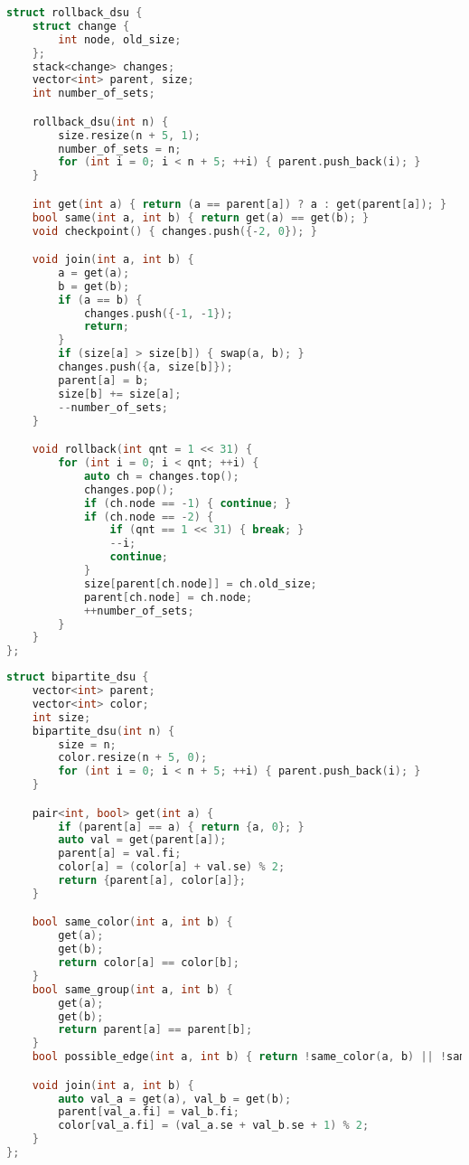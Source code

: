 \documentclass[11pt, a4paper, twoside]{article}
\begin{document}
\begin{lstlisting}[language=C++]
struct rollback_dsu {
    struct change {
        int node, old_size;
    };
    stack<change> changes;
    vector<int> parent, size;
    int number_of_sets;

    rollback_dsu(int n) {
        size.resize(n + 5, 1);
        number_of_sets = n;
        for (int i = 0; i < n + 5; ++i) { parent.push_back(i); }
    }

    int get(int a) { return (a == parent[a]) ? a : get(parent[a]); }
    bool same(int a, int b) { return get(a) == get(b); }
    void checkpoint() { changes.push({-2, 0}); }

    void join(int a, int b) {
        a = get(a);
        b = get(b);
        if (a == b) {
            changes.push({-1, -1});
            return;
        }
        if (size[a] > size[b]) { swap(a, b); }
        changes.push({a, size[b]});
        parent[a] = b;
        size[b] += size[a];
        --number_of_sets;
    }

    void rollback(int qnt = 1 << 31) {
        for (int i = 0; i < qnt; ++i) {
            auto ch = changes.top();
            changes.pop();
            if (ch.node == -1) { continue; }
            if (ch.node == -2) {
                if (qnt == 1 << 31) { break; }
                --i;
                continue;
            }
            size[parent[ch.node]] = ch.old_size;
            parent[ch.node] = ch.node;
            ++number_of_sets;
        }
    }
};
\end{lstlisting}

\begin{lstlisting}[language=C++]
struct bipartite_dsu {
    vector<int> parent;
    vector<int> color;
    int size;
    bipartite_dsu(int n) {
        size = n;
        color.resize(n + 5, 0);
        for (int i = 0; i < n + 5; ++i) { parent.push_back(i); }
    }

    pair<int, bool> get(int a) {
        if (parent[a] == a) { return {a, 0}; }
        auto val = get(parent[a]);
        parent[a] = val.fi;
        color[a] = (color[a] + val.se) % 2;
        return {parent[a], color[a]};
    }

    bool same_color(int a, int b) {
        get(a);
        get(b);
        return color[a] == color[b];
    }
    bool same_group(int a, int b) {
        get(a);
        get(b);
        return parent[a] == parent[b];
    }
    bool possible_edge(int a, int b) { return !same_color(a, b) || !same_group(a, b); }

    void join(int a, int b) {
        auto val_a = get(a), val_b = get(b);
        parent[val_a.fi] = val_b.fi;
        color[val_a.fi] = (val_a.se + val_b.se + 1) % 2;
    }
};
\end{lstlisting}
\end{document}
